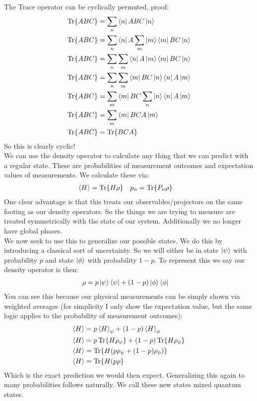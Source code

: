 The Trace operator can be cyclically permuted, proof:
\begin{align*}
	\Tr{ABC} &= \sum_n \bra{n}ABC\ket{n}\\
	\Tr{ABC} &= \sum_n \bra{n}A\sum_m\ket{m}\bra{m}BC\ket{n}\\
	\Tr{ABC} &= \sum_n \sum_m\bra{n}A\ket{m}\bra{m}BC\ket{n}\\
	\Tr{ABC} &=  \sum_n\sum_m\bra{m}BC\ket{n}\bra{n}A\ket{m}\\
	\Tr{ABC} &=  \sum_m\bra{m}BC\sum_n\ket{n}\bra{n}A\ket{m}\\
	\Tr{ABC} &=  \sum_m\bra{m}BCA\ket{m} \\
	\Tr{ABC} &=  \Tr{BCA}
\end{align*}
So this is clearly cyclic! \\
We can use the density operator to calculate any thing that we can predict with a regular state. These are probabilities of measurement outcomes and expectation values of measurements. We calculate these via:
\begin{align*}
	\expval{H} &= \Tr{H\rho} &
	p_n &= \Tr{P_n\rho}
\end{align*}
One clear advantage is that this treats our observables/projectors on the same footing as our density operators. So the things we are trying to measure are treated symmetrically with the state of our system. Additionally we no longer have global phases. \\
We now seek to use this to generalize our possible states. We do this by introducing a classical sort of uncertainty. So we will either be in state $\ket{\psi}$ with probability $p$ and state $\ket{\phi}$ with probability $1-p$.
To represent this we say our density operator is then:
\begin{align*}
	\rho &= p\ket{\psi}\bra{\psi} + (1-p)\ket{\phi}\bra{\phi}
\end{align*}
You can see this because our physical measurements can be simply shown via weighted averages (for simplicity I only show the expectation value, but the same logic applies to the probability of measurement outcomes):
\begin{align*}
	\expval{H} &= p\expval{H}_\psi + (1-p)\expval{H}_\phi \\
	\expval{H} &= p\Tr{H\rho_\psi} + (1-p)\Tr{H\rho_\phi} \\
	\expval{H} &= \Tr{H(p\rho_\psi + (1-p)\rho_\phi)} \\
	\expval{H} &= \Tr{H(p\rho}
\end{align*}
Which is the exact prediction we would then expect. Generalizing this again to many probabilities follows naturally. We call these new states mixed quantum states. \\
